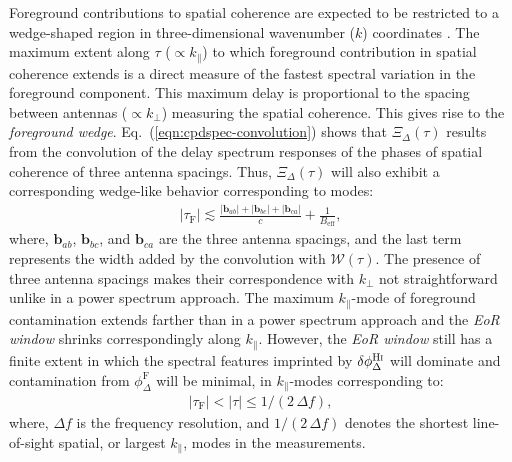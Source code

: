 \documentclass[
reprint,
superscriptaddress,
amsmath,
amssymb,
aps,
prd
]{revtex4-1}
\begin{document}
Foreground contributions to spatial coherence are expected to be restricted to a wedge-shaped region in three-dimensional wavenumber ($k$) coordinates \cite{bow09,liu09,liu14a,liu14b,dat10,liu11,gho12,mor12,par12b,tro12,ved12,dil13,pob13,thy13,thy15a,thy15b,thy16,dil14}. The maximum extent along $\tau$ ($\propto k_\parallel$) to which foreground contribution in spatial coherence extends is a direct measure of the fastest spectral variation in the foreground component. This maximum delay is proportional to the spacing between antennas ($\propto k_\perp$) measuring the spatial coherence. This gives rise to the {\it foreground wedge}. Eq.~(\ref{eqn:cpdspec-convolution}) shows that $\Xi_\Delta(\tau)$ results from the convolution of the delay spectrum responses of the phases of spatial coherence of three antenna spacings. Thus, $\Xi_\Delta(\tau)$ will also exhibit a corresponding wedge-like behavior corresponding to modes:
\begin{align}
  |\tau_\textrm{F}| \lesssim \frac{|\bm{b}_{ab}| + |\bm{b}_{bc}| + |\bm{b}_{ca}|}{c} + \frac{1}{B_\textrm{eff}}, \label{eqn:cp-FG-wedge}
\end{align}
where, $\bm{b}_{ab}$, $\bm{b}_{bc}$, and $\bm{b}_{ca}$ are the three antenna spacings, and the last term represents the width added by the convolution with $\mathcal{W}(\tau)$. The presence of three antenna spacings makes their correspondence with $k_\perp$ not straightforward unlike in a power spectrum approach. The maximum $k_\parallel$-mode of foreground contamination extends farther than in a power spectrum approach and the {\it EoR window} shrinks  correspondingly along $k_\parallel$. However, the {\it EoR window} still has a finite extent in which the spectral features imprinted by $\delta\phi_\Delta^\textrm{H{\sc i}}$ will dominate and contamination from $\phi_\Delta^\textrm{F}$ will be minimal, in $k_\parallel$-modes corresponding to:
\begin{align}
  |\tau_\textrm{F}| < |\tau| \leq 1/(2\,\Delta f), \label{eqn:cp-EoR-window}
\end{align}
where, $\Delta f$ is the frequency resolution, and $1/(2\,\Delta f)$ denotes the shortest line-of-sight spatial, or largest $k_\parallel$, modes in the measurements.
\end{document}
